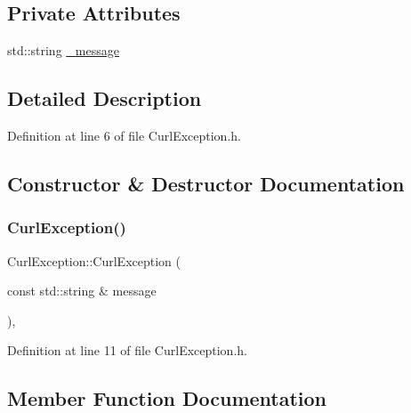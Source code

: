 \subsection*{Private Attributes}
\begin{DoxyCompactItemize}
\item 
std\+::string \mbox{\hyperlink{struct_curl_exception_a4b8d06e0dfd0bcd24fd33456c0ec7594}{\+\_\+message}}
\end{DoxyCompactItemize}


\subsection{Detailed Description}


Definition at line 6 of file Curl\+Exception.\+h.



\subsection{Constructor \& Destructor Documentation}
\mbox{\label{struct_curl_exception_a90a114603f1009527490faa93207881e}} 
\subsubsection{\texorpdfstring{Curl\+Exception()}{CurlException()}}
{\footnotesize\ttfamily Curl\+Exception\+::\+Curl\+Exception (\begin{DoxyParamCaption}\item[{const std\+::string \&}]{message }\end{DoxyParamCaption})\hspace{0.3cm}{\ttfamily [inline]}, {\ttfamily [explicit]}}



Definition at line 11 of file Curl\+Exception.\+h.



\subsection{Member Function Documentation}
\mbox{\label{struct_curl_exception_a14ac5b23a8cd9e134832d1dd76d78fc1}} 
